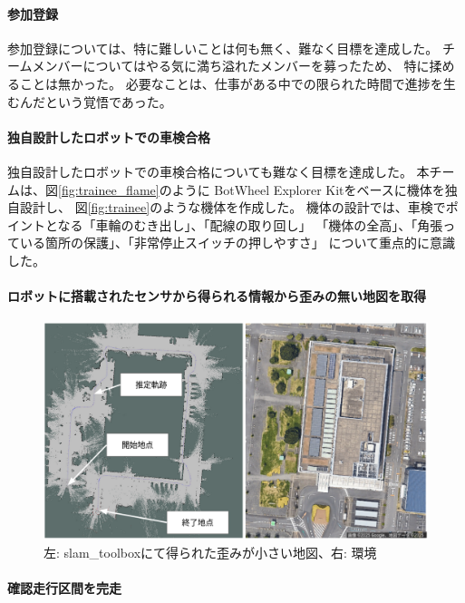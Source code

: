 \documentclass[twocolumn,9pt]{jsproceedings}
\begin{document}
\paragraph{参加登録}
参加登録については、特に難しいことは何も無く、難なく目標を達成した。
チームメンバーについてはやる気に満ち溢れたメンバーを募ったため、
特に揉めることは無かった。
必要なことは、仕事がある中での限られた時間で進捗を生むんだという覚悟であった。

\paragraph{独自設計したロボットでの車検合格}
独自設計したロボットでの車検合格についても難なく目標を達成した。
本チームは、図\ref{fig:trainee_flame}のように
BotWheel Explorer Kitをベースに機体を独自設計し、
図\ref{fig:trainee}のような機体を作成した。
機体の設計では、車検でポイントとなる「車輪のむき出し」、「配線の取り回し」
「機体の全高」、「角張っている箇所の保護」、「非常停止スイッチの押しやすさ」
について重点的に意識した。

\paragraph{ロボットに搭載されたセンサから得られる情報から歪みの無い地図を取得}

\begin{figure}[h]
  \begin{center}
    \includegraphics[width=1.0\linewidth]{figs/map.pdf}
    \caption{左: slam\_toolboxにて得られた歪みが小さい地図、右: 環境}
    \label{fig:map}
  \end{center}
\end{figure}

\paragraph{確認走行区間を完走}
\end{document}
